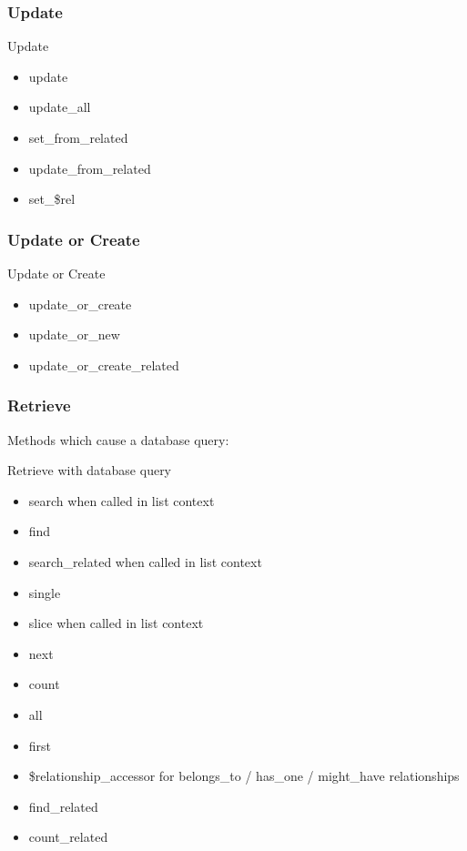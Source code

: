 \subsubsection{Update}

\begin{frame}{Update}
\begin{itemize}
\item update
\item update\_all
\item set\_from\_related
\item update\_from\_related
\item set\_\$rel
\end{itemize}
\end{frame}

\subsubsection{Update or Create}

\begin{frame}{Update or Create}
\begin{itemize}
\item update\_or\_create
\item update\_or\_new
\item update\_or\_create\_related
\end{itemize}
\end{frame}

\subsubsection{Retrieve}

Methods which cause a database query:

\begin{frame}{Retrieve with database query}
\begin{itemize}
\item search when called in list context
\item find
\item search\_related when called in list context
\item single
\item slice when called in list context
\item next
\item count
\item all
\item first
\item \$relationship\_accessor for belongs\_to / has\_one / might\_have relationships
\item find\_related
\item count\_related
\end{itemize}
\end{frame}


